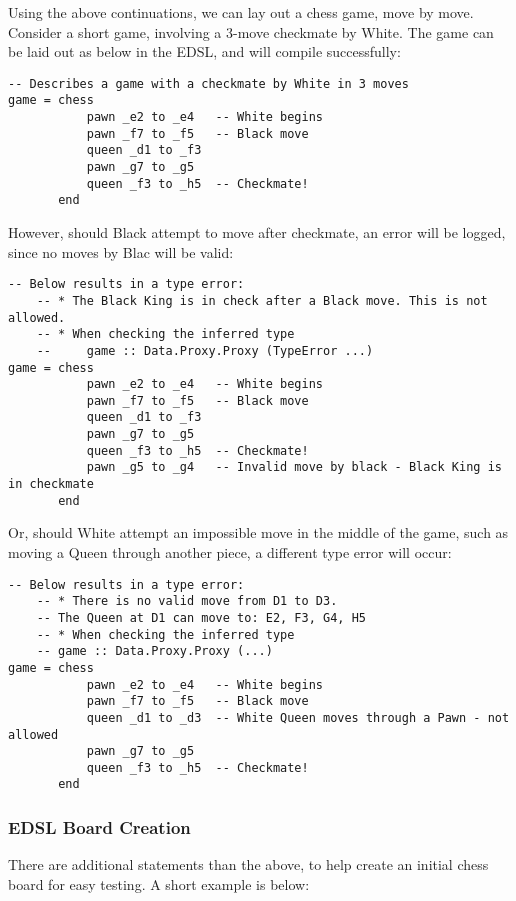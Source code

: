 \documentclass[12pt, a4paper]{scrartcl}
\begin{document}
Using the above continuations, we can lay out a chess game, move by move. Consider a short game, involving a 3-move checkmate by White. The game can be laid out as below in the EDSL, and will compile successfully:

\begin{lstlisting}
-- Describes a game with a checkmate by White in 3 moves
game = chess
           pawn _e2 to _e4   -- White begins
           pawn _f7 to _f5   -- Black move
           queen _d1 to _f3
           pawn _g7 to _g5
           queen _f3 to _h5  -- Checkmate!
       end
\end{lstlisting}

However, should Black attempt to move after checkmate, an error will be logged, since no moves by Blac will be valid:

\begin{lstlisting}
-- Below results in a type error:
    -- * The Black King is in check after a Black move. This is not allowed.
    -- * When checking the inferred type
    --     game :: Data.Proxy.Proxy (TypeError ...)
game = chess
           pawn _e2 to _e4   -- White begins
           pawn _f7 to _f5   -- Black move
           queen _d1 to _f3
           pawn _g7 to _g5
           queen _f3 to _h5  -- Checkmate!
           pawn _g5 to _g4   -- Invalid move by black - Black King is in checkmate
       end
\end{lstlisting}

Or, should White attempt an impossible move in the middle of the game, such as moving a Queen through another piece, a different type error will occur:

\begin{lstlisting}
-- Below results in a type error:
    -- * There is no valid move from D1 to D3.
    -- The Queen at D1 can move to: E2, F3, G4, H5
    -- * When checking the inferred type
    -- game :: Data.Proxy.Proxy (...)
game = chess
           pawn _e2 to _e4   -- White begins
           pawn _f7 to _f5   -- Black move
           queen _d1 to _d3  -- White Queen moves through a Pawn - not allowed
           pawn _g7 to _g5
           queen _f3 to _h5  -- Checkmate!
       end
\end{lstlisting}

\subsubsection{EDSL Board Creation}

There are additional statements than the above, to help create an initial chess board for easy testing. A short example is below:
\end{document}
